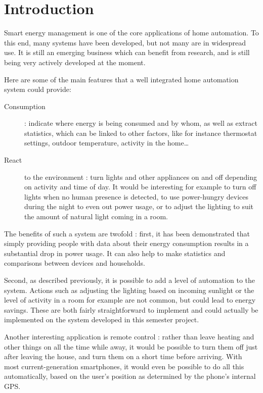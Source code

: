 \section*{Introduction}
Smart energy management is one of the core applications of home automation. To
this end, many systems have been developed, but not many are in widespread use.
It is still an emerging business which can benefit from research, and is still
being very actively developed at the moment.

Here are some of the main features that a well integrated home automation system
could provide:
\begin{description}
  \item[Consumption] : indicate where energy is being consumed and by whom, as
    well as extract statistics, which can be linked to other factors, like for
    instance thermostat settings, outdoor temperature, activity in the
    home\ldots
  \item[React] to the environment : turn lights and other appliances on and off
    depending on activity and time of day. It would be interesting for example
    to turn off lights when no human presence is detected, to use power-hungry
    devices during the night to even out power usage, or to adjust the lighting
    to suit the amount of natural light coming in a room. 
\end{description}

The benefits of such a system are twofold : first, it has been
demonstrated\cite{darby2006} that simply providing people with data about their
energy consumption results in a substantial drop in power usage. It can also
help to make statistics and comparisons between devices and households.

Second, as described previously, it is possible to add a level of automation to
the system. Actions such as adjusting the lighting based on incoming sunlight or
the level of activity in a room for example are not common, but could lead to
energy savings. These are both fairly straightforward to implement and could
actually be implemented on the system developed in this semester project.

Another interesting application is remote control : rather than leave heating
and other things on all the time while away, it would be possible to turn them
off just after leaving the house, and turn them on a short time before arriving.
With most current-generation smartphones, it would even be possible to do all
this automatically, based on the user's position as determined by the phone's
internal GPS.


